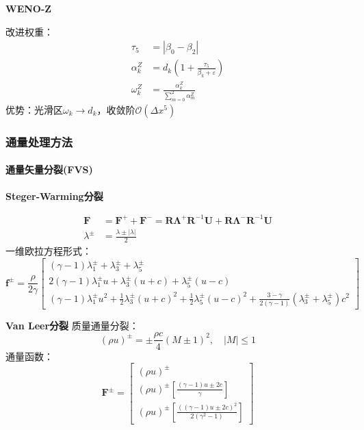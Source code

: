 \documentclass[UTF8]{ctexart}
\begin{document}
\textbf{WENO-Z}

改进权重：
\begin{align}
\tau_5 &= |\beta_0 - \beta_2| \\
\alpha_k^Z &= d_k \left( 1 + \frac{\tau_5}{\beta_k + \varepsilon} \right) \\
\omega_k^Z &= \frac{\alpha_k^Z}{\sum_{m=0}^{2} \alpha_m^Z}
\end{align}
优势：光滑区$\omega_k \to d_k$，收敛阶$\mathcal{O}(\Delta x^5)$

\subsubsection{通量处理方法}

\paragraph{通量矢量分裂(FVS)}

\textbf{Steger-Warming分裂}

\begin{align}
\mathbf{F} &= \mathbf{F}^+ + \mathbf{F}^- = \mathbf{R}\mathbf{\Lambda}^+\mathbf{R}^{-1}\mathbf{U} + \mathbf{R}\mathbf{\Lambda}^-\mathbf{R}^{-1}\mathbf{U} \\
\lambda^\pm &= \frac{\lambda \pm |\lambda|}{2}
\end{align}
一维欧拉方程形式：
\begin{equation}
\mathbf{f}^{\pm} = \frac{\rho}{2\gamma} \begin{bmatrix}
(\gamma-1)\lambda_1^\pm + \lambda_3^\pm + \lambda_5^\pm \\
2(\gamma-1)\lambda_1^\pm u + \lambda_3^\pm (u+c) + \lambda_5^\pm (u-c) \\
(\gamma-1)\lambda_1^\pm u^2 + \frac{1}{2}\lambda_3^\pm (u+c)^2 + \frac{1}{2}\lambda_5^\pm (u-c)^2 + \frac{3-\gamma}{2(\gamma-1)}(\lambda_3^\pm + \lambda_5^\pm)c^2
\end{bmatrix}
\end{equation}

\textbf{Van Leer分裂}
\cite{vanleer1982}
质量通量分裂：
\begin{equation}
(\rho u)^\pm = \pm \frac{\rho c}{4} (M \pm 1)^2, \quad |M| \leq 1
\end{equation}
通量函数：
\begin{equation}
\mathbf{F}^\pm = \begin{bmatrix}
(\rho u)^\pm \\
(\rho u)^\pm \left[ \frac{(\gamma-1)u \pm 2c}{\gamma} \right] \\
(\rho u)^\pm \left[ \frac{ \left( (\gamma-1)u \pm 2c \right)^2 }{2(\gamma^2-1)} \right]
\end{bmatrix}
\end{equation}
\end{document}
